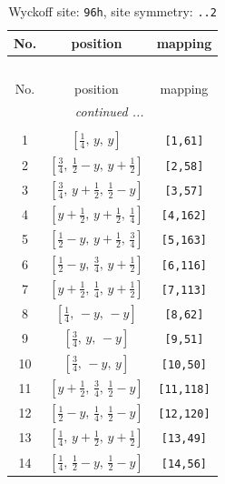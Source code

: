 \documentclass[fleqn,8pt]{jsarticle}
\begin{document}
\begin{longtable}{ccc}
\caption{Wyckoff site: {\tt 96h}, site symmetry: {\tt ..2}}
 \\
 \hline \hline
No. & position & mapping \\ \hline \endfirsthead

\multicolumn{2}{l}{\tablename\ \thetable{}} \\
 \hline \hline
No. & position & mapping \\ \hline \endhead

 \hline \hline
\multicolumn{2}{r}{\footnotesize\it continued ...} \\ \endfoot

 \hline \hline
\multicolumn{2}{r}{} \\ \endlastfoot

1 & $\left[ \frac{1}{4},\, y,\, y \right]$ & {\tt [1,61]} \\ \hline
2 & $\left[ \frac{3}{4},\, \frac{1}{2} - y,\, y + \frac{1}{2} \right]$ & {\tt [2,58]} \\ \hline
3 & $\left[ \frac{3}{4},\, y + \frac{1}{2},\, \frac{1}{2} - y \right]$ & {\tt [3,57]} \\ \hline
4 & $\left[ y + \frac{1}{2},\, y + \frac{1}{2},\, \frac{1}{4} \right]$ & {\tt [4,162]} \\ \hline
5 & $\left[ \frac{1}{2} - y,\, y + \frac{1}{2},\, \frac{3}{4} \right]$ & {\tt [5,163]} \\ \hline
6 & $\left[ \frac{1}{2} - y,\, \frac{3}{4},\, y + \frac{1}{2} \right]$ & {\tt [6,116]} \\ \hline
7 & $\left[ y + \frac{1}{2},\, \frac{1}{4},\, y + \frac{1}{2} \right]$ & {\tt [7,113]} \\ \hline
8 & $\left[ \frac{1}{4},\, - y,\, - y \right]$ & {\tt [8,62]} \\ \hline
9 & $\left[ \frac{3}{4},\, y,\, - y \right]$ & {\tt [9,51]} \\ \hline
10 & $\left[ \frac{3}{4},\, - y,\, y \right]$ & {\tt [10,50]} \\ \hline
11 & $\left[ y + \frac{1}{2},\, \frac{3}{4},\, \frac{1}{2} - y \right]$ & {\tt [11,118]} \\ \hline
12 & $\left[ \frac{1}{2} - y,\, \frac{1}{4},\, \frac{1}{2} - y \right]$ & {\tt [12,120]} \\ \hline
13 & $\left[ \frac{1}{4},\, y + \frac{1}{2},\, y + \frac{1}{2} \right]$ & {\tt [13,49]} \\ \hline
14 & $\left[ \frac{1}{4},\, \frac{1}{2} - y,\, \frac{1}{2} - y \right]$ & {\tt [14,56]} \\ \hline

\end{longtable}
\end{document}
